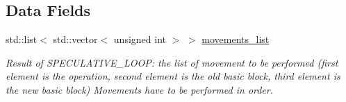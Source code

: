 \subsection*{Data Fields}
\begin{DoxyCompactItemize}
\item 
std\+::list$<$ std\+::vector$<$ unsigned int $>$ $>$ \hyperlink{classSDCScheduling_a3f80309c4288473c20955008832e39cf}{movements\+\_\+list}
\begin{DoxyCompactList}\small\item\em Result of S\+P\+E\+C\+U\+L\+A\+T\+I\+V\+E\+\_\+\+L\+O\+OP\+: the list of movement to be performed (first element is the operation, second element is the old basic block, third element is the new basic block) Movements have to be performed in order. \end{DoxyCompactList}\end{DoxyCompactItemize}
